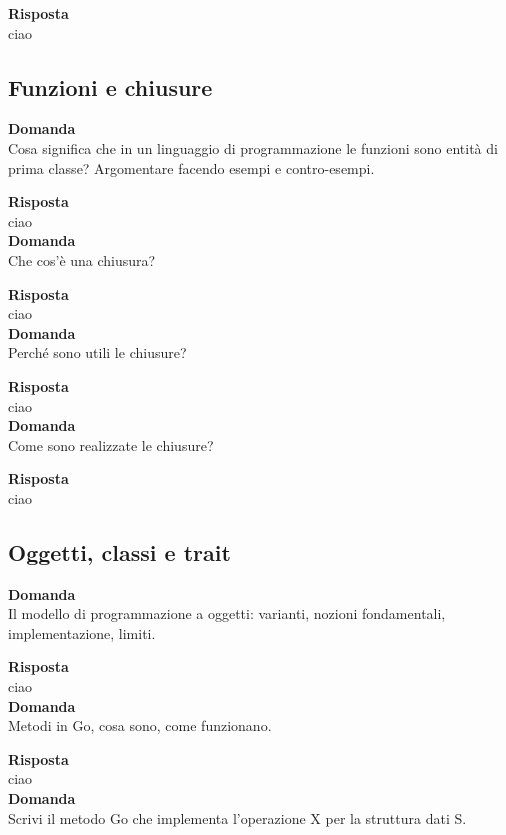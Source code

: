 \documentclass{article}
\begin{document}
\textbf{Risposta}\\
ciao
\vspace{14pt}\\

\subsection*{Funzioni e chiusure}
\textbf{Domanda}\\
Cosa significa che in un linguaggio di programmazione le funzioni sono entità di prima classe? Argomentare facendo esempi e contro-esempi.

\textbf{Risposta}\\
ciao
\vspace{14pt}\\
\textbf{Domanda}\\
Che cos’è una chiusura?

\textbf{Risposta}\\
ciao
\vspace{14pt}\\
\textbf{Domanda}\\
Perché sono utili le chiusure?

\textbf{Risposta}\\
ciao
\vspace{14pt}\\
\textbf{Domanda}\\
Come sono realizzate le chiusure?

\textbf{Risposta}\\
ciao
\vspace{14pt}\\

\subsection*{Oggetti, classi e trait}
\textbf{Domanda}\\
Il modello di programmazione a oggetti: varianti, nozioni fondamentali, implementazione, limiti.

\textbf{Risposta}\\
ciao
\vspace{14pt}\\
\textbf{Domanda}\\
Metodi in Go, cosa sono, come funzionano.

\textbf{Risposta}\\
ciao
\vspace{14pt}\\
\textbf{Domanda}\\
Scrivi il metodo Go che implementa l’operazione X per la struttura dati S.
\end{document}
